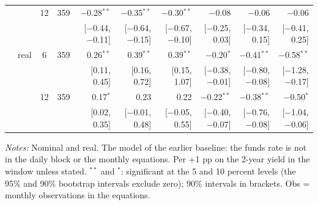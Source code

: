 \begin{longtable}{llcrrrrrrr}
 &  & 12 & 359 & $-$0.28$^{**}$ & $-$0.35$^{**}$ & $-$0.30$^{**}$ & $-$0.08 & $-$0.06 & $-$0.06\\
 & & & & {\scriptsize [$-$0.44, $-$0.11]} & {\scriptsize [$-$0.64, $-$0.15]} & {\scriptsize [$-$0.67, $-$0.10]} & {\scriptsize [$-$0.25, 0.03]} & {\scriptsize [$-$0.34, 0.15]} & {\scriptsize [$-$0.41, 0.25]}\\
 & real & 6 & 359 & 0.26$^{**}$ & 0.39$^{**}$ & 0.39$^{**}$ & $-$0.20$^{*}$ & $-$0.41$^{**}$ & $-$0.58$^{**}$\\
 & & & & {\scriptsize [0.11, 0.45]} & {\scriptsize [0.16, 0.72]} & {\scriptsize [0.15, 1.07]} & {\scriptsize [$-$0.38, $-$0.01]} & {\scriptsize [$-$0.80, $-$0.08]} & {\scriptsize [$-$1.28, $-$0.17]}\\
 &  & 12 & 359 & 0.17$^{*}$ & 0.23 & 0.22 & $-$0.22$^{**}$ & $-$0.38$^{**}$ & $-$0.50$^{*}$\\
 & & & & {\scriptsize [0.02, 0.35]} & {\scriptsize [$-$0.01, 0.48]} & {\scriptsize [$-$0.05, 0.55]} & {\scriptsize [$-$0.40, $-$0.07]} & {\scriptsize [$-$0.76, $-$0.08]} & {\scriptsize [$-$1.04, $-$0.06]}\\
\end{longtable}
\begin{flushleft}\footnotesize\textit{Notes:} Nominal and real. The model of the earlier baseline: the funds rate is not in the daily block or the monthly equations. Per +1 pp on the 2-year yield in the window unless stated. $^{**}$ and $^{*}$: significant at the 5 and 10 percent levels (the 95\% and 90\% bootstrap intervals exclude zero); 90\% intervals in brackets. Obs = monthly observations in the equations.\end{flushleft}
\endgroup
